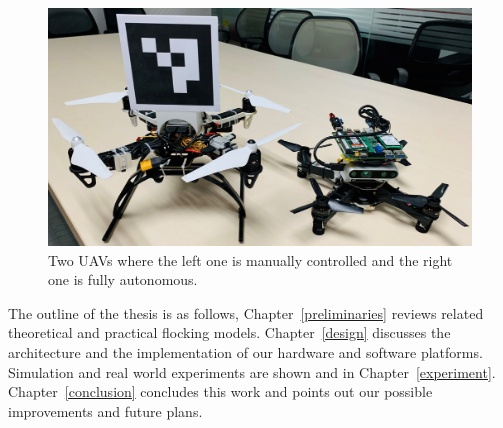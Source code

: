 \begin{figure}[htb]
  \centering
  \includegraphics[width=1\textwidth]{figure/chapter_1/twin.jpg}
  \caption{Two UAVs where the left one is manually controlled and the right one is fully autonomous.}
  \label{fig:twin}
\end{figure}

The outline of the thesis is as follows, Chapter~\ref{preliminaries} reviews related theoretical and practical flocking models. Chapter~\ref{design} discusses the architecture and the implementation of our hardware and software platforms. Simulation and real world experiments are shown and in Chapter~\ref{experiment}. Chapter~\ref{conclusion} concludes this work and points out our possible improvements and future plans.

\newpage
